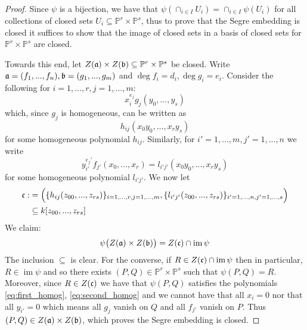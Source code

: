 \documentclass[12pt]{article}
\theoremstyle{plain}
\theoremstyle{definition}
\newcommand{\bb}[1]{\mathbb{#1}}
\begin{document}
\begin{proof}
Since $\psi$ is a bijection, we have that $\psi(\cap_{i \in I}U_i) = \cap_{i \in I}\psi(U_i)$ for all collections of closed sets $U_i \subseteq \bb{P}^r \times \bb{P}^s$, thus to prove that the Segre embedding is closed it suffices to show that the image of closed sets in a basis of closed sets for $\bb{P}^r \times \bb{P}^s$ are closed.

Towards this end, let $Z(\frak{a}) \times Z(\frak{b}) \subseteq \bb{P}^r \times \bb{P}^s$ be closed. Write $\frak{a} = (f_1,...,f_n), \frak{b} = (g_1,...,g_m)$ and $\operatorname{deg}f_i = d_i, \operatorname{deg}g_i = e_i$. Consider the following for $i = 1,...,r, j = 1,..., m$:
\begin{equation}\label{eq:first_homog}
    x_i^{e_j}g_j(y_0,...,y_s)
\end{equation}
which, since $g_j$ is homogeneous, can be written as
\begin{equation}
    h_{ij}(x_0y_0,...,x_ry_s)
\end{equation}
for some homogeneous polynomial $h_{ij}$. Similarly, for $i' = 1,...,m, j' = 1,...,n$ we write
\begin{equation}\label{eq:second_homog}
    y_{i'}^{e_j'}f_{j'}(x_0,...,x_r) = l_{i'j'}(x_0y_0,...,x_ry_s)
\end{equation}
for some homogeneous polynomial $l_{i'j'}$. We now let
\begin{align*}
    \frak{c} :&= \Big(\lbrace h_{ij}(z_{00},...,z_{rs})\rbrace_{i = 1,...,r, j = 1,...,m}, \lbrace l_{i'j'}(z_{00},...,z_{rs})\rbrace_{i' = 1,...,n, j' = 1,...,s}\Big)\\
    &\subseteq k[z_{00},...,z_{rs}]
\end{align*}
We claim:
\begin{equation}
    \psi\big(Z(\frak{a}) \times Z(\frak{b})\big) = Z(\frak{c}) \cap \operatorname{im}\psi
\end{equation}
The inclusion $\subseteq$ is clear. For the converse, if $R \in Z(\frak{c}) \cap \operatorname{im}\psi$ then in particular, $R \in \operatorname{im}\psi$ and so there exists $(P,Q) \in \bb{P}^r \times \bb{P}^s$ such that $\psi(P,Q) =R$. Moreover, since $R \in Z(\frak{c})$ we have that $\psi(P,Q)$ satisfies the polynomials \eqref{eq:first_homog}, \eqref{eq:second_homog} and we cannot have that all $x_i = 0$ nor that all $y_{i'} = 0$ which means all $g_j$ vanish on $Q$ and all $f_{j'}$ vanish on $P$. Thus $(P,Q) \in Z(\frak{a}) \times Z(\frak{b})$, which proves the Segre embedding is closed.


\end{proof}
\end{document}
